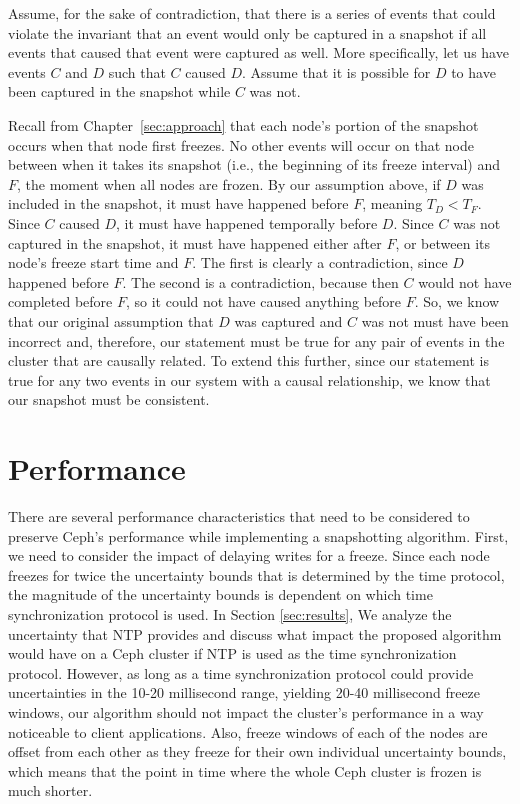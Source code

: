Assume, for the sake of contradiction, that there is a series of
events that could violate the invariant that an event would only be
captured in a snapshot if all events that caused that event were
captured as well. More specifically, let us have events $C$ and $D$
such that $C$ caused $D$. Assume that it is possible for $D$ to have
been captured in the snapshot while $C$ was not.

Recall from Chapter~\ref{sec:approach} that each node's portion of the
snapshot occurs when that node first freezes. No other events will
occur on that node between when it takes its snapshot (i.e., the
beginning of its freeze interval) and $F$, the moment when all nodes
are frozen. By our assumption above, if $D$ was included in the
snapshot, it must have happened before $F$, meaning $T_D <T_F$. Since
$C$ caused $D$, it must have happened temporally before $D$.  Since
$C$ was not captured in the snapshot, it must have happened either
after $F$, or between its node's freeze start time and $F$. The first
is clearly a contradiction, since $D$ happened before $F$. The second
is a contradiction, because then $C$ would not have completed before
$F$, so it could not have caused anything before $F$. So, we know that
our original assumption that $D$ was captured and $C$ was not must
have been incorrect and, therefore, our statement must be true for any
pair of events in the cluster that are causally related. To extend
this further, since our statement is true for any two events in our
system with a causal relationship, we know that our snapshot must be
consistent.

\section{Performance}

There are several performance characteristics that need to be
considered to preserve Ceph's performance while implementing a
snapshotting algorithm. First, we need to consider the impact of
delaying writes for a freeze. Since each node freezes for twice the
uncertainty bounds that is determined by the time protocol, the
magnitude of the uncertainty bounds is dependent on which time
synchronization protocol is used. In Section \ref{sec:results}, We
analyze the uncertainty that NTP provides and discuss what impact the
proposed algorithm would have on a Ceph cluster if NTP is used as the
time synchronization protocol. However, as long as a time
synchronization protocol could provide uncertainties in the 10-20
millisecond range, yielding 20-40 millisecond
freeze %
windows, our algorithm should not impact the cluster's performance in
a way noticeable to client applications.  Also, freeze windows of each
of the nodes are offset from each other as they freeze for their own
individual uncertainty bounds, which means that the point in time
where the whole Ceph cluster is frozen is much shorter.

